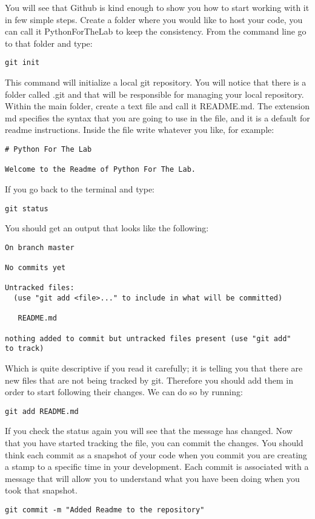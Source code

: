 You will see that Github is kind enough to show you how to start working with it in few simple steps. Create a folder where you would like to host your code, you can call it PythonForTheLab to keep the consistency. From the command line go to that folder and type:
\begin{verbatim}
git init
\end{verbatim}
This command will initialize a local git repository. You will notice that there is a folder called .git and that will be responsible for managing your local repository. Within the main folder, create a text file and call it README.md. The extension md specifies the syntax that you are going to use in the file, and it is a default for readme instructions. Inside the file write whatever you like, for example:
\begin{verbatim}
# Python For The Lab

Welcome to the Readme of Python For The Lab. 
\end{verbatim}

If you go back to the terminal and type:
\begin{verbatim}
git status
\end{verbatim}

You should get an output that looks like the following:
\begin{verbatim}
On branch master

No commits yet

Untracked files:
  (use "git add <file>..." to include in what will be committed)

   README.md

nothing added to commit but untracked files present (use "git add" 
to track) 
\end{verbatim}

Which is quite descriptive if you read it carefully; it is telling you that there are new files that are not being tracked by git. Therefore you should add them in order to start following their changes. We can do so by running:
\begin{verbatim}
git add README.md 
\end{verbatim}

If you check the status again you will see that the message has changed. Now that you have started tracking the file, you can commit the changes. You should think each commit as a snapshot of your code when you commit you are creating a stamp to a specific time in your development. Each commit is associated with a message that will allow you to understand what you have been doing when you took that snapshot.
\begin{verbatim}
git commit -m "Added Readme to the repository" 
\end{verbatim}

